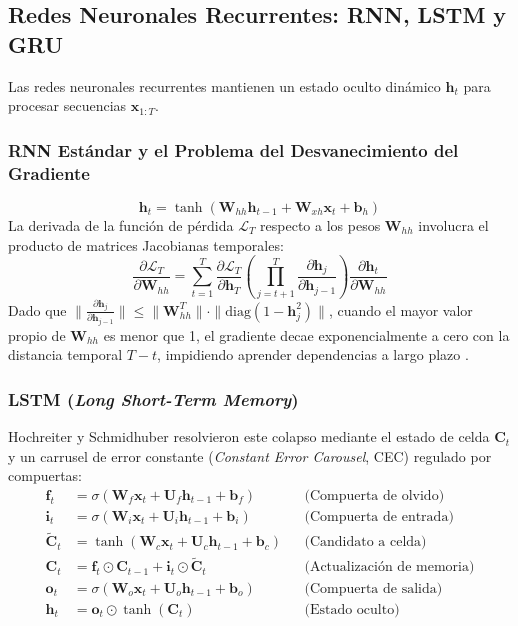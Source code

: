 \subsection{Redes Neuronales Recurrentes: RNN, LSTM y GRU}

Las redes neuronales recurrentes mantienen un estado oculto dinámico $\bm{h}_t$ para procesar secuencias $\bm{x}_{1:T}$.

\subsubsection{RNN Estándar y el Problema del Desvanecimiento del Gradiente}
\begin{equation}
    \bm{h}_t = \tanh(\bm{W}_{hh} \bm{h}_{t-1} + \bm{W}_{xh} \bm{x}_t + \bm{b}_h)
\end{equation}
La derivada de la función de pérdida $\mathcal{L}_T$ respecto a los pesos $\bm{W}_{hh}$ involucra el producto de matrices Jacobianas temporales:
\begin{equation}
    \frac{\partial \mathcal{L}_T}{\partial \bm{W}_{hh}} = \sum_{t=1}^T \frac{\partial \mathcal{L}_T}{\partial \bm{h}_T} \left( \prod_{j=t+1}^T \frac{\partial \bm{h}_j}{\partial \bm{h}_{j-1}} \right) \frac{\partial \bm{h}_t}{\partial \bm{W}_{hh}}
\end{equation}
Dado que $\|\frac{\partial \bm{h}_j}{\partial \bm{h}_{j-1}}\| \le \|\bm{W}_{hh}^T\| \cdot \|\text{diag}(1 - \bm{h}_j^2)\|$, cuando el mayor valor propio de $\bm{W}_{hh}$ es menor que 1, el gradiente decae exponencialmente a cero con la distancia temporal $T - t$, impidiendo aprender dependencias a largo plazo \cite{hochreiter1997long}.

\subsubsection{LSTM (\textit{Long Short-Term Memory})}
Hochreiter y Schmidhuber \cite{hochreiter1997long} resolvieron este colapso mediante el estado de celda $\bm{C}_t$ y un carrusel de error constante (\textit{Constant Error Carousel}, CEC) regulado por compuertas:
\begin{align}
    \bm{f}_t &= \sigma(\bm{W}_f \bm{x}_t + \bm{U}_f \bm{h}_{t-1} + \bm{b}_f) && \text{(Compuerta de olvido)} \\
    \bm{i}_t &= \sigma(\bm{W}_i \bm{x}_t + \bm{U}_i \bm{h}_{t-1} + \bm{b}_i) && \text{(Compuerta de entrada)} \\
    \tilde{\bm{C}}_t &= \tanh(\bm{W}_c \bm{x}_t + \bm{U}_c \bm{h}_{t-1} + \bm{b}_c) && \text{(Candidato a celda)} \\
    \bm{C}_t &= \bm{f}_t \odot \bm{C}_{t-1} + \bm{i}_t \odot \tilde{\bm{C}}_t && \text{(Actualización de memoria)} \\
    \bm{o}_t &= \sigma(\bm{W}_o \bm{x}_t + \bm{U}_o \bm{h}_{t-1} + \bm{b}_o) && \text{(Compuerta de salida)} \\
    \bm{h}_t &= \bm{o}_t \odot \tanh(\bm{C}_t) && \text{(Estado oculto)}
\end{align}

